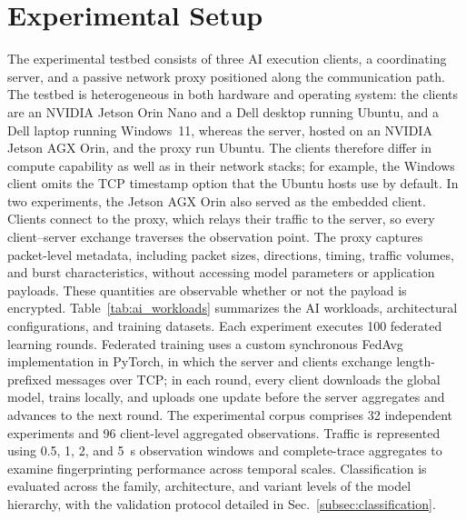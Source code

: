 \section{Experimental Setup}
\label{sec:setup}
The experimental testbed consists of three AI execution clients, a coordinating
server, and a passive network proxy positioned along the communication path.
The testbed is heterogeneous in both hardware and operating system: the clients
are an NVIDIA Jetson Orin Nano and a Dell desktop running Ubuntu, and a Dell
laptop running Windows~11, whereas the server, hosted on an NVIDIA Jetson AGX
Orin, and the proxy run Ubuntu. The clients therefore differ in compute
capability as well as in their network stacks; for example, the Windows client
omits the TCP timestamp option that the Ubuntu hosts use by default. In two
experiments, the Jetson AGX Orin also served as the embedded client. Clients
connect to the proxy, which relays their traffic to the server, so every
client--server exchange traverses the observation point. The proxy captures packet-level metadata, including packet
sizes, directions, timing, traffic volumes, and burst characteristics, without
accessing model parameters or application payloads. These quantities are
observable whether or not the payload is encrypted. Table~\ref{tab:ai_workloads}
summarizes the AI workloads, architectural configurations, and training
datasets. Each experiment executes 100 federated learning rounds. Federated
training uses a custom synchronous FedAvg implementation in PyTorch, in which
the server and clients exchange length-prefixed messages over TCP; in each
round, every client downloads the global model, trains locally, and uploads one
update before the server aggregates and advances to the next round. The
experimental corpus comprises 32 independent experiments and 96 client-level
aggregated observations. Traffic is represented using 0.5, 1, 2, and 5~s
observation windows and complete-trace aggregates to examine fingerprinting
performance across temporal scales. Classification is evaluated across the
family, architecture, and variant levels of the model hierarchy, with the
validation protocol detailed in Sec.~\ref{subsec:classification}.

